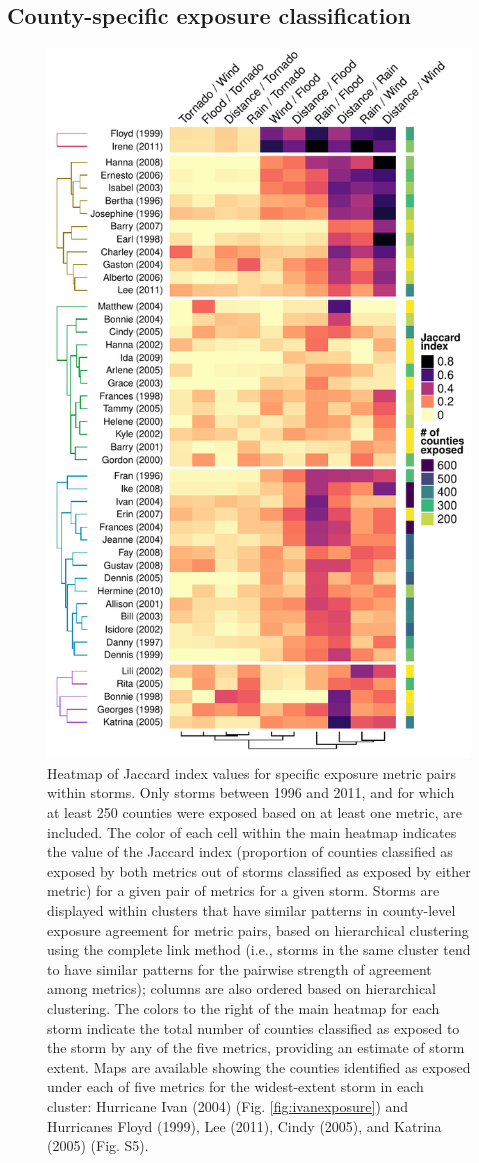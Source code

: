 \documentclass[fleqn,10pt,lineno]{olplainarticle}
\begin{document}
\subsection*{County-specific exposure classification}

\begin{figure}%
\centering 
\includegraphics[width = 0.7\linewidth]{jaccard_heatmap} 
\caption{Heatmap of Jaccard index values for
specific exposure metric pairs within storms. Only storms between 1996 and 2011,
and for which at least 250 counties were exposed based on at least one metric,
are included. The color of each cell within the main heatmap indicates the value
of the Jaccard index (proportion of counties classified as exposed by both
metrics out of storms classified as exposed by either metric) for a given pair
of metrics for a given storm. Storms are displayed within clusters that have
similar patterns in county-level exposure agreement for metric pairs, based on
hierarchical clustering using the complete link method
\citep{murtagh2012algorithms} (i.e., storms in the same cluster tend to have
similar patterns for the pairwise strength of agreement among metrics); columns
are also ordered based on hierarchical clustering. The colors to the right of
the main heatmap for each storm indicate the total number of counties classified
as exposed to the storm by any of the five metrics, providing an estimate of
storm extent. Maps are available showing the counties identified as exposed
under each of five metrics for the widest-extent storm in each cluster:
Hurricane Ivan (2004) (Fig. \ref{fig:ivanexposure}) and Hurricanes Floyd (1999),
Lee (2011), Cindy (2005), and Katrina (2005) (Fig. S5).} 
\label{fig:jaccard}
\end{figure}
\end{document}
